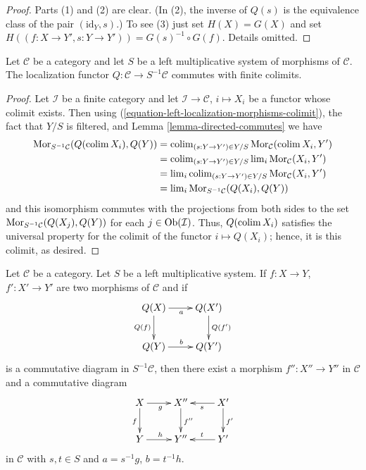 \begin{proof}
Parts (1) and (2) are clear. (In (2), the inverse of $Q(s)$ is
the equivalence class of the pair $(\text{id}_Y, s)$.)
To see (3) just set $H(X) = G(X)$
and set $H((f : X \to Y', s : Y \to Y')) = G(s)^{-1} \circ G(f)$.
Details omitted.
\end{proof}

\begin{lemma}
\label{lemma-left-localization-limits}
Let $\mathcal{C}$ be a category and let $S$ be a left multiplicative
system of morphisms of $\mathcal{C}$. The localization functor
$Q : \mathcal{C} \to S^{-1}\mathcal{C}$ commutes with finite colimits.
\end{lemma}

\begin{proof}
Let $\mathcal{I}$ be a finite category and let
$\mathcal{I} \to \mathcal{C}$, $i \mapsto X_i$
be a functor whose colimit exists. Then using
(\ref{equation-left-localization-morphisms-colimit}),
the fact that $Y/S$ is filtered, and
Lemma \ref{lemma-directed-commutes} we have
\begin{align*}
\mathop{\mathrm{Mor}}\nolimits_{S^{-1}\mathcal{C}}(Q(\mathop{\mathrm{colim}}\nolimits X_i), Q(Y))
& =
\mathop{\mathrm{colim}}\nolimits_{(s : Y \to Y') \in Y/S} \mathop{\mathrm{Mor}}\nolimits_\mathcal{C}(\mathop{\mathrm{colim}}\nolimits X_i, Y') \\
& =
\mathop{\mathrm{colim}}\nolimits_{(s : Y \to Y') \in Y/S} \mathop{\mathrm{lim}}\nolimits_i \mathop{\mathrm{Mor}}\nolimits_\mathcal{C}(X_i, Y') \\
& =
\mathop{\mathrm{lim}}\nolimits_i \mathop{\mathrm{colim}}\nolimits_{(s : Y \to Y') \in Y/S} \mathop{\mathrm{Mor}}\nolimits_\mathcal{C}(X_i, Y') \\
& =
\mathop{\mathrm{lim}}\nolimits_i \mathop{\mathrm{Mor}}\nolimits_{S^{-1}\mathcal{C}}(Q(X_i), Q(Y))
\end{align*}
and this isomorphism commutes with the projections
from both sides to the set
$\mathop{\mathrm{Mor}}\nolimits_{S^{-1}\mathcal{C}}(Q(X_j), Q(Y))$ for each
$j \in \mathop{\mathrm{Ob}}\nolimits(\mathcal{I})$. Thus, $Q(\mathop{\mathrm{colim}}\nolimits X_i)$ satisfies
the universal property for the colimit of the functor
$i \mapsto Q(X_i)$; hence, it is this colimit, as desired.
\end{proof}

\begin{lemma}
\label{lemma-left-localization-diagram}
Let $\mathcal{C}$ be a category. Let $S$ be a left multiplicative
system. If $f : X \to Y$, $f' : X' \to Y'$ are two morphisms of
$\mathcal{C}$ and if
$$
\xymatrix{
Q(X) \ar[d]_{Q(f)} \ar[r]_a & Q(X') \ar[d]^{Q(f')} \\
Q(Y) \ar[r]^b & Q(Y')
}
$$
is a commutative diagram in $S^{-1}\mathcal{C}$, then there exist
a morphism $f'' : X'' \to Y''$ in $\mathcal{C}$ and a commutative
diagram
$$
\xymatrix{
X \ar[d]_f \ar[r]_g & X'' \ar[d]^{f''} & X' \ar[d]^{f'} \ar[l]^s \\
Y \ar[r]^h & Y'' & Y' \ar[l]_t
}
$$
in $\mathcal{C}$ with $s, t \in S$ and $a = s^{-1}g$, $b = t^{-1}h$.
\end{lemma}

